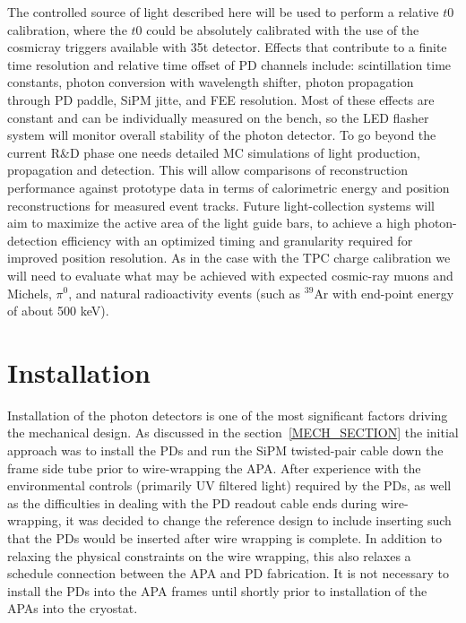 The controlled source of light described here will be used to perform
a relative $t0$ calibration, where the $t0$ could be absolutely
calibrated with the use of the cosmicray triggers available with
35t detector. Effects that contribute to a finite time resolution
and relative time offset of PD channels include: scintillation time
constants, photon conversion with wavelength shifter, photon
propagation through PD paddle, SiPM jitte, and FEE resolution. Most of
these effects are constant and can be individually measured on the
bench, so the LED flasher system will monitor overall stability of the
photon detector.  To go beyond the current R\&D phase one needs
detailed MC simulations of light production, propagation and
detection. This will allow comparisons of reconstruction performance against
prototype data in terms of calorimetric energy and position
reconstructions for measured event tracks. Future light-collection
systems will aim to maximize the active area of the light guide bars,
to achieve a high photon-detection efficiency with an optimized timing
and granularity required for improved position resolution. As in the
case with the TPC charge calibration we will need to evaluate what may
be achieved with expected cosmic-ray muons and Michels, $\pi^0$, and
natural radioactivity events (such as $^{39}$Ar with end-point energy
of about 500 keV).

\section{Installation}

Installation of the photon detectors is one of the most significant
factors driving the mechanical design.  As discussed in the
section~\ref{MECH_SECTION} the initial approach was to install the PDs
and run the SiPM twisted-pair cable down the frame side tube prior to
wire-wrapping the APA.  After experience with the environmental
controls (primarily UV filtered light) required by the PDs, as well as
the difficulties in dealing with the PD readout cable ends during
wire-wrapping, it was decided to change the reference design to
include inserting such that the PDs would be inserted after wire
wrapping is complete.  In addition to relaxing the physical
constraints on the wire wrapping, this also relaxes a schedule
connection between the APA and PD fabrication.  It is not necessary to
install the PDs into the APA frames until shortly prior to
installation of the APAs into the cryostat.

